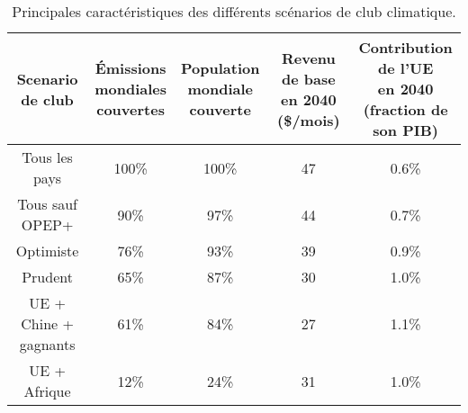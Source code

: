 \begin{table}[h]

\caption{\label{tab:scenarios_table_fr.tex}Principales caractéristiques des différents scénarios de club climatique.}
\centering
\begin{tabular}[t]{ccccc}
\toprule
\makecell{Scenario\\de club} & \makecell{Émissions\\mondiales\\couvertes} & \makecell{Population\\mondiale\\couverte} & \makecell{Revenu de base\\en 2040\\(\$/mois)} & \makecell{Contribution de l'UE\\en 2040\\(fraction de son PIB)}\\
\midrule
Tous les pays & 100\% & 100\% & 47 & 0.6\%\\
Tous sauf OPEP+ & 90\% & 97\% & 44 & 0.7\%\\
Optimiste & 76\% & 93\% & 39 & 0.9\%\\
Prudent & 65\% & 87\% & 30 & 1.0\%\\
UE + Chine + gagnants & 61\% & 84\% & 27 & 1.1\%\\
UE + Afrique & 12\% & 24\% & 31 & 1.0\%\\
\bottomrule
\end{tabular}
\end{table}
